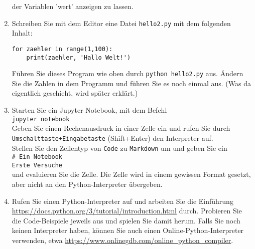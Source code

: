 \begin{enumerate}[1.]
der Variablen 'wert' anzeigen zu lassen.
\item Schreiben Sie mit dem Editor  eine Datei \texttt{hello2.py} mit dem folgenden Inhalt:
\begin{lstlisting}
for zaehler in range(1,100):
    print(zaehler, 'Hallo Welt!')
\end{lstlisting}
Führen Sie dieses Program wie oben durch \texttt{python hello2.py} aus.
Ändern Sie die Zahlen in dem Programm und führen Sie es noch einmal aus.
(Was da eigentlich geschieht, wird später erklärt.)
\newpage
\item Starten Sie ein Jupyter Notebook, mit dem Befehl\\
\texttt{jupyter notebook}\\
Geben Sie einen Rechenausdruck in einer Zelle ein und
rufen Sie durch \texttt{Umschalttaste+Eingabetaste} (Shift+Enter) 
den Interpreter auf.\\
Stellen Sie den Zellentyp von \texttt{Code} zu \texttt{Markdown} um 
und geben Sie ein \\
\verb|# Ein Notebook|\\
\verb|Erste Versuche|\\
und evaluieren Sie die Zelle. Die Zelle wird in einem gewissen
Format gesetzt, aber nicht an den Python-Interpreter übergeben.
\item Rufen Sie einen Python-Interpreter auf und arbeiten Sie die Einführung
\url{https://docs.python.org/3/tutorial/introduction.html} durch.
Probieren Sie die Code-Beispiele jeweils aus und spielen Sie damit herum.
Falls Sie noch keinen Interpreter haben, können Sie auch einen  Online-Python-Interpreter
verwenden, etwa \url{https://www.onlinegdb.com/online_python_compiler}.
\end{enumerate}

